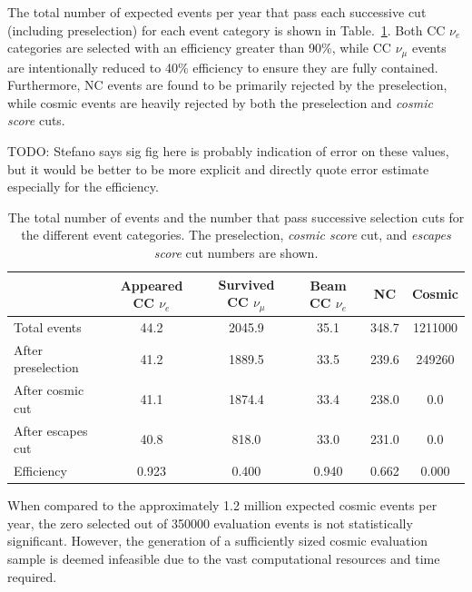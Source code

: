 The total number of expected events per year that pass each successive cut (including
preselection) for each event category is shown in Table.~\ref{tab:selection}. Both CC $\nu_{e}$
categories are selected with an efficiency greater than 90\%, while CC $\nu_{\mu}$ events are
intentionally reduced to 40\% efficiency to ensure they are fully contained. Furthermore, NC
events are found to be primarily rejected by the preselection, while cosmic events are heavily
rejected by both the preselection and \emph{cosmic score} cuts.

TODO: Stefano says sig fig here is probably indication of error on these values, but it would be
better to be more explicit and directly quote error estimate especially for the efficiency.

\begin{table}
    \begin{tabular}{lccccc}
                           & Appeared CC $\nu_{e}$ & Survived CC $\nu_{\mu}$ & Beam CC $\nu_{e}$ & NC    & Cosmic  \\
        \midrule
        Total events       & 44.2                  & 2045.9                  & 35.1              & 348.7 & 1211000 \\
        After preselection & 41.2                  & 1889.5                  & 33.5              & 239.6 & 249260  \\
        After cosmic cut   & 41.1                  & 1874.4                  & 33.4              & 238.0 & 0.0     \\
        After escapes cut  & 40.8                  & 818.0                   & 33.0              & 231.0 & 0.0     \\
        \midrule
        Efficiency         & 0.923                 & 0.400                   & 0.940             & 0.662 & 0.000   \\
    \end{tabular}
    \caption[Number of events passing basic cuts for each event category.]
    {The total number of events and the number that pass successive selection cuts for the
        different event categories. The preselection, \emph{cosmic score} cut, and \emph{escapes
            score} cut numbers are shown.}
    \label{tab:selection}
\end{table}

When compared to the approximately 1.2 million expected cosmic events per year, the zero selected
out of 350000 evaluation events is not statistically significant. However, the generation of a
sufficiently sized cosmic evaluation sample is deemed infeasible due to the vast computational
resources and time required.

